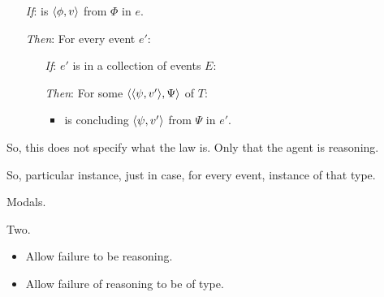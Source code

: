 \begin{note}
  \begin{idea}
    \label{idea:tR-law}

    \begin{itemize}
    \item[\emph{If}:]
      \vAgent{} is \emph{\tCV{}} \(\langle \phi, v \rangle\) from \(\Phi\) in \(e\).
    \item[\emph{Then}:]
      For every event \(e'\):
      \begin{itemize}
      \item[\emph{If}:]
        \(e'\) is in a collection of events \(E\):
      \item[\emph{Then}:]
        For some \tI{} \(\langle \langle \psi, v' \rangle, \Psi \rangle\) of \(T\):
        \begin{itemize}
        \item
          \vAgent{} is concluding \(\langle \psi, v' \rangle\) from \(\Psi\) in \(e'\).
        \end{itemize}
      \end{itemize}
    \end{itemize}
    \vspace{-\baselineskip}
  \end{idea}

  So, this does not specify what the law is.
  Only that the agent is reasoning.

  So, particular instance, just in case, for every event, instance of that type.

  Modals.

  Two.

  \begin{itemize}
  \item
    Allow failure to be reasoning.
  \item
    Allow failure of reasoning to be of type.
  \end{itemize}
\end{note}

